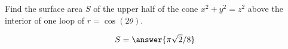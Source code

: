 \documentclass{ximera}
\author{David Guichard \and Neal Koblitz \and H. Jerome Keisler \and Albert Scheller \and Barry Balof \and Mike Wills \and Matthew Carr}
\begin{document}
\begin{exercise}





Find the surface area $S$ of the upper half of the cone $x^2+y^2=z^2$ above the interior of one loop of $r=\cos(2\theta)$.

\begin{prompt}
\[
S=\answer{\pi \sqrt{2}/8}
\]
\end{prompt}



\end{exercise}
\end{document}
